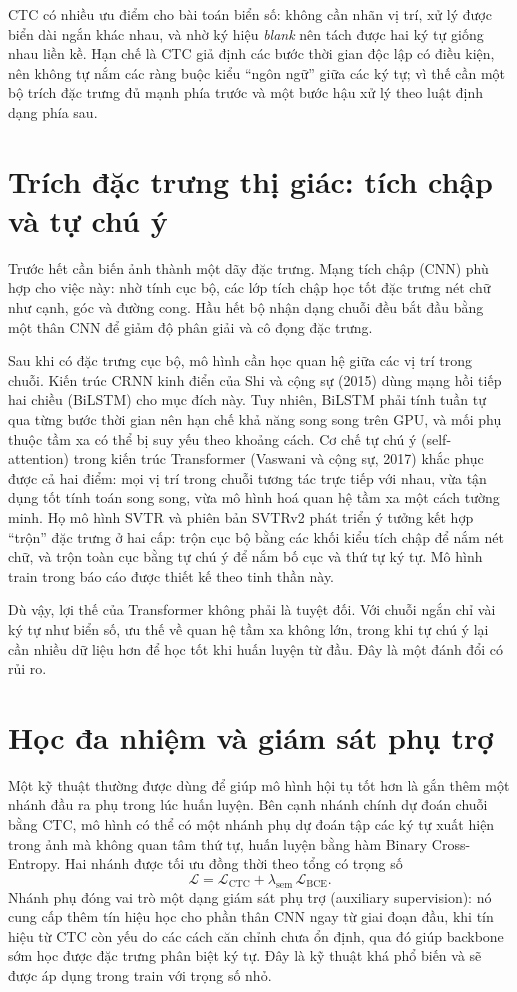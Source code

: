 \documentclass[12pt,a4paper]{report}
\begin{document}
CTC có nhiều ưu điểm cho bài toán biển số: không cần nhãn vị trí, xử lý được biển dài ngắn khác nhau, và nhờ ký hiệu \emph{blank} nên tách được hai ký tự giống nhau liền kề. Hạn chế là CTC giả định các bước thời gian độc lập có điều kiện, nên không tự nắm các ràng buộc kiểu ``ngôn ngữ'' giữa các ký tự; vì thế cần một bộ trích đặc trưng đủ mạnh phía trước và một bước hậu xử lý theo luật định dạng phía sau.

\section{Trích đặc trưng thị giác: tích chập và tự chú ý}
Trước hết cần biến ảnh thành một dãy đặc trưng. Mạng tích chập (CNN) phù hợp cho việc này: nhờ tính cục bộ, các lớp tích chập học tốt đặc trưng nét chữ như cạnh, góc và đường cong. Hầu hết bộ nhận dạng chuỗi đều bắt đầu bằng một thân CNN để giảm độ phân giải và cô đọng đặc trưng.

Sau khi có đặc trưng cục bộ, mô hình cần học quan hệ giữa các vị trí trong chuỗi. Kiến trúc CRNN kinh điển của Shi và cộng sự (2015) dùng mạng hồi tiếp hai chiều (BiLSTM) cho mục đích này. Tuy nhiên, BiLSTM phải tính tuần tự qua từng bước thời gian nên hạn chế khả năng song song trên GPU, và mối phụ thuộc tầm xa có thể bị suy yếu theo khoảng cách. Cơ chế tự chú ý (self-attention) trong kiến trúc Transformer (Vaswani và cộng sự, 2017) khắc phục được cả hai điểm: mọi vị trí trong chuỗi tương tác trực tiếp với nhau, vừa tận dụng tốt tính toán song song, vừa mô hình hoá quan hệ tầm xa một cách tường minh. Họ mô hình SVTR và phiên bản SVTRv2 phát triển ý tưởng kết hợp ``trộn'' đặc trưng ở hai cấp: trộn cục bộ bằng các khối kiểu tích chập để nắm nét chữ, và trộn toàn cục bằng tự chú ý để nắm bố cục và thứ tự ký tự. Mô hình train trong báo cáo được thiết kế theo tinh thần này.

Dù vậy, lợi thế của Transformer không phải là tuyệt đối. Với chuỗi ngắn chỉ vài ký tự như biển số, ưu thế về quan hệ tầm xa không lớn, trong khi tự chú ý lại cần nhiều dữ liệu hơn để học tốt khi huấn luyện từ đầu. Đây là một đánh đổi có rủi ro.

\section{Học đa nhiệm và giám sát phụ trợ}
Một kỹ thuật thường được dùng để giúp mô hình hội tụ tốt hơn là gắn thêm một nhánh đầu ra phụ trong lúc huấn luyện. Bên cạnh nhánh chính dự đoán chuỗi bằng CTC, mô hình có thể có một nhánh phụ dự đoán tập các ký tự xuất hiện trong ảnh mà không quan tâm thứ tự, huấn luyện bằng hàm Binary Cross-Entropy. Hai nhánh được tối ưu đồng thời theo tổng có trọng số
\begin{equation}
\mathcal{L} = \mathcal{L}_{\text{CTC}} + \lambda_{\text{sem}}\,\mathcal{L}_{\text{BCE}}.
\end{equation}
Nhánh phụ đóng vai trò một dạng giám sát phụ trợ (auxiliary supervision): nó cung cấp thêm tín hiệu học cho phần thân CNN ngay từ giai đoạn đầu, khi tín hiệu từ CTC còn yếu do các cách căn chỉnh chưa ổn định, qua đó giúp backbone sớm học được đặc trưng phân biệt ký tự. Đây là kỹ thuật khá phổ biến và sẽ được áp dụng trong train với trọng số nhỏ.
\end{document}
